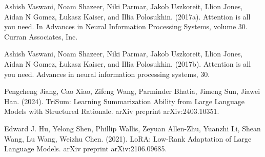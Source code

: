 
\renewcommand{\bibname}{References}

\begin{thebibliography}{99}

 Ashish Vaswani, Noam Shazeer, Niki Parmar, Jakob Uszkoreit, Llion Jones, Aidan N Gomez, Łukasz Kaiser, and Illia Polosukhin. (2017a). Attention is all you need. In Advances in Neural Information Processing Systems, volume 30. Curran Associates, Inc.

 Ashish Vaswani, Noam Shazeer, Niki Parmar, Jakob Uszkoreit, Llion Jones, Aidan N Gomez, Łukasz Kaiser, and Illia Polosukhin. (2017b). Attention is all you need. Advances in neural information processing systems, 30.

 Pengcheng Jiang, Cao Xiao, Zifeng Wang, Parminder Bhatia, Jimeng Sun, Jiawei Han. (2024). TriSum: Learning Summarization Ability from Large Language Models with Structured Rationale. arXiv preprint arXiv:2403.10351.

 Edward J. Hu, Yelong Shen, Phillip Wallis, Zeyuan Allen-Zhu, Yuanzhi Li, Shean Wang, Lu Wang, Weizhu Chen. (2021). LoRA: Low-Rank Adaptation of Large Language Models. arXiv preprint arXiv:2106.09685.

\end{thebibliography}